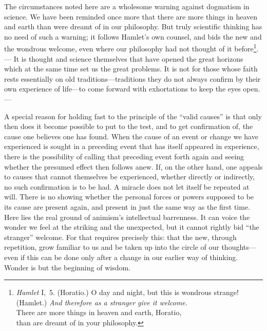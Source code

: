 \documentclass[12pt,a4paper]{article}
\newcommand{\opage}[1]{\marginnote{\footnotesize\textit{[#1]}}}
\begin{document}
The circumstances noted here are a wholesome warning against dogmatism in science.
We have been reminded once more that there are more things in heaven and earth than
were dreamt of in our philosophy. But truly scientific thinking has no need of such
a warning; it follows Hamlet's own counsel, and bids the new and the wondrous
welcome, even where our philosophy had not thought of it before\footnote{\emph{Hamlet}
I,~5. (Horatio.) O day and night, but this is wondrous strange!\\ (Hamlet.)
\emph{And therefore as a stranger give it welcome.}\\ There are more things in
heaven and earth, Horatio,\\ than are dreamt of in your philosophy.}. --- It is
thought and science themselves that have opened the great horizons which at the
same time set us the great problems. It is not for those whose faith rests
essentially on old traditions---traditions they do not always confirm by their own
experience of life---to come forward with exhortations to keep the eyes open. ---

A special reason for holding fast to the principle of the ``valid causes'' is that
only then does it become possible to put to the test, and to get confirmation of,
the cause one believes one has found. When the cause of an event or change we have
experienced is sought in a preceding event that has itself appeared in experience,
there is the possibility of calling that preceding event forth again and seeing
whether the presumed effect then follows anew. If, on the other hand, one appeals
to \opage{27}causes that cannot themselves be experienced, whether directly or indirectly, no
such confirmation is to be had. A miracle does not let itself be repeated at will.
There is no showing whether the personal forces or powers supposed to be its cause
are present again, and present in just the same way as the first time. Here lies the
real ground of animism's intellectual barrenness. It can voice the wonder we feel at
the striking and the unexpected, but it cannot rightly bid ``the stranger'' welcome.
For that requires precisely this: that the new, through repetition, grow familiar to
us and be taken up into the circle of our thoughts---even if this can be done only
after a change in our earlier way of thinking. Wonder is but the beginning of wisdom.
\end{document}
